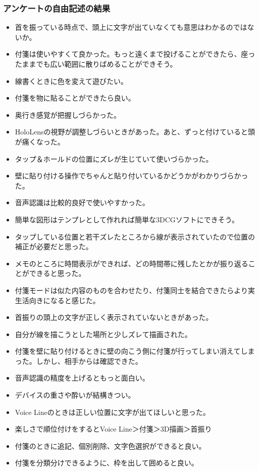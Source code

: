 \documentclass[11pt,a4j, titlepage]{jarticle} %
\begin{document}
\subsubsection*{アンケートの自由記述の結果}
\begin{itemize}
	\item 首を振っている時点で、頭上に文字が出ていなくても意思はわかるのではないか。
        \item 付箋は使いやすくて良かった。もっと遠くまで投げることができたら、座ったままでも広い範囲に散りばめることができそう。
	\item 線書くときに色を変えて遊びたい。
	\item 付箋を物に貼ることができたら良い。
	\item 奥行き感覚が把握しづらかった。
	\item HoloLensの視野が調整しづらいときがあった。あと、ずっと付けていると頭が痛くなった。
	\item タップ＆ホールドの位置にズレが生じていて使いづらかった。
	\item 壁に貼り付ける操作でちゃんと貼り付いているかどうかがわかりづらかった。
	\item 音声認識は比較的良好で使いやすかった。
	\item 簡単な図形はテンプレとして作れれば簡単な3DCGソフトにできそう。
	\item タップしている位置と若干ズレたところから線が表示されていたので位置の補正が必要だと思った。
	\item メモのところに時間表示ができれば、どの時間帯に残したとかが振り返ることができると思った。
	\item 付箋モードは似た内容のものを合わせたり、付箋同士を結合できたらより実生活向きになると感じた。
	\item 首振りの頭上の文字が正しく表示されていないときがあった。
	\item 自分が線を描こうとした場所と少しズレて描画された。
	\item 付箋を壁に貼り付けるときに壁の向こう側に付箋が行ってしまい消えてしまった。しかし、相手からは確認できた。
	\item 音声認識の精度を上げるともっと面白い。
	\item デバイスの重さや酔いが結構きつい。
	\item Voice Lineのときは正しい位置に文字が出てほしいと思った。
	\item 楽しさで順位付けをするとVoice Line＞付箋＞3D描画＞首振り
	\item 付箋のときに追記、個別削除、文字色選択ができると良い。
	\item 付箋を分類分けできるように、枠を出して囲めると良い。
\end{itemize}
\end{document}
